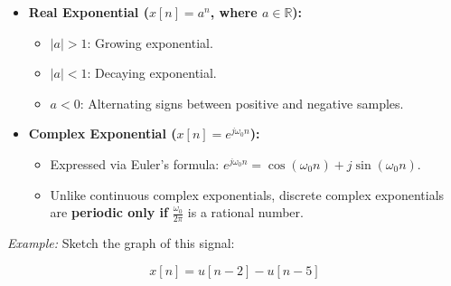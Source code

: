 \begin{itemize}
\tightlist
\item
  \textbf{Real Exponential (\(x[n] = a^n\), where
  \(a \in \mathbb{R}\)):}

  \begin{itemize}
  \tightlist
  \item
    \(|a| > 1\): Growing exponential.
  \item
    \(|a| < 1\): Decaying exponential.
  \item
    \(a < 0\): Alternating signs between positive and negative samples.
  \end{itemize}
\item
  \textbf{Complex Exponential (\(x[n] = e^{j\omega_0 n}\)):}

  \begin{itemize}
  \tightlist
  \item
    Expressed via Euler's formula:
    \(e^{j\omega_0 n} = \cos(\omega_0 n) + j \sin(\omega_0 n)\).
  \item
    Unlike continuous complex exponentials, discrete complex
    exponentials are \textbf{periodic only if} \(\frac{\omega_0}{2\pi}\)
    is a rational number.
  \end{itemize}
\end{itemize}

\emph{Example:} Sketch the graph of this signal:

\[  
x[n]=u[n-2]-u[n-5]  
\]

